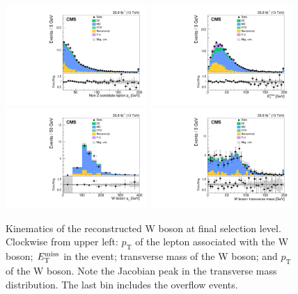 \begin{figure}[!h]
\centering
\includegraphics[width=0.48\textwidth]{figures/dibosons/wz3l/lepWpT_Nminus1.pdf}
\includegraphics[width=0.48\textwidth]{figures/dibosons/wz3l/met_Nminus1.pdf}
\includegraphics[width=0.48\textwidth]{figures/dibosons/wz3l/pTW.pdf}
\includegraphics[width=0.48\textwidth]{figures/dibosons/wz3l/mTW.pdf}
\caption{Kinematics of the reconstructed W boson at final selection level. Clockwise from upper left: 
$p_\mathrm{T}$ of the lepton associated with the W boson;
$E_\mathrm{T}^{\mathrm{miss}}$ in the event; transverse mass of the W boson;
and $p_\mathrm{T}$ of the W boson.
Note the Jacobian peak in the transverse mass distribution.
The last bin includes the overflow events.
\label{fig:wz3l_w}}
\end{figure}





